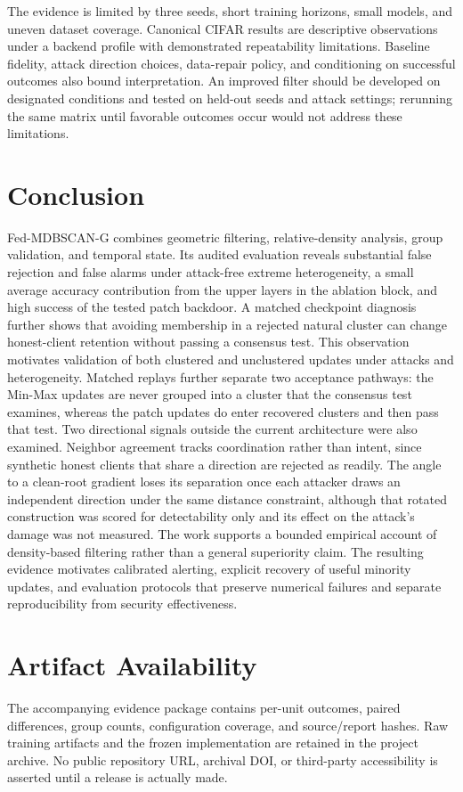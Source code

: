 \documentclass[journal]{IEEEtran}
\newcommand{\method}{Fed-MDBSCAN-G}
\begin{document}
The evidence is limited by three seeds, short training horizons, small models, and uneven dataset coverage. Canonical CIFAR results are descriptive observations under a backend profile with demonstrated repeatability limitations. Baseline fidelity, attack direction choices, data-repair policy, and conditioning on successful outcomes also bound interpretation. An improved filter should be developed on designated conditions and tested on held-out seeds and attack settings; rerunning the same matrix until favorable outcomes occur would not address these limitations.

\section{Conclusion}
\method{} combines geometric filtering, relative-density analysis, group validation, and temporal state. Its audited evaluation reveals substantial false rejection and false alarms under attack-free extreme heterogeneity, a small average accuracy contribution from the upper layers in the ablation block, and high success of the tested patch backdoor. A matched checkpoint diagnosis further shows that avoiding membership in a rejected natural cluster can change honest-client retention without passing a consensus test. This observation motivates validation of both clustered and unclustered updates under attacks and heterogeneity. Matched replays further separate two acceptance pathways: the Min-Max updates are never grouped into a cluster that the consensus test examines, whereas the patch updates do enter recovered clusters and then pass that test. Two directional signals outside the current architecture were also examined. Neighbor agreement tracks coordination rather than intent, since synthetic honest clients that share a direction are rejected as readily. The angle to a clean-root gradient loses its separation once each attacker draws an independent direction under the same distance constraint, although that rotated construction was scored for detectability only and its effect on the attack's damage was not measured. The work supports a bounded empirical account of density-based filtering rather than a general superiority claim. The resulting evidence motivates calibrated alerting, explicit recovery of useful minority updates, and evaluation protocols that preserve numerical failures and separate reproducibility from security effectiveness.

\section*{Artifact Availability}
The accompanying evidence package contains per-unit outcomes, paired differences, group counts, configuration coverage, and source/report hashes. Raw training artifacts and the frozen implementation are retained in the project archive. No public repository URL, archival DOI, or third-party accessibility is asserted until a release is actually made.


\end{document}
